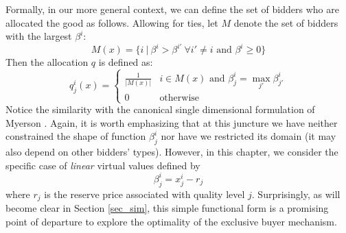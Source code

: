 \documentclass{article}
\begin{document}
Formally, in our more general context, we can define the set of bidders who are allocated the good as follows. Allowing for ties, let $M$ denote the set of bidders with the largest $\beta^i$:
\begin{equation}
    M(x) = \{ i \ | \ \beta^i > \beta^{i'} \ \forall i' \neq i \text{ and } \beta^i \geq 0 \}
\end{equation}
\noindent Then the allocation $q$ is defined as:
\begin{equation}
    q_j^i(x) = \begin{cases}
        \frac{1}{|M(x)|} & i \in M(x) \text{ and } \beta_j^i = \max_{j'} \beta_{j'}^i \\
        0 & \text{otherwise}
    \end{cases}
\end{equation}
\noindent Notice the similarity with the canonical single dimensional formulation of Myerson \autocite*{myerson1981optimal}. Again, it is worth emphasizing that at this juncture we have neither constrained the shape of function $\beta_j^i$ nor have we restricted its domain (it may also depend on other bidders' types). However, in this chapter, we consider the specific case of \textit{linear} virtual values defined by
\begin{equation}
    \beta_j^i = x_j^i - r_j
\end{equation}
\noindent where $r_j$ is the reserve price associated with quality level $j$. Surprisingly, as will become clear in Section \ref{sec_sim}, this simple functional form is a promising point of departure to explore the optimality of the exclusive buyer mechanism. 
\end{document}
